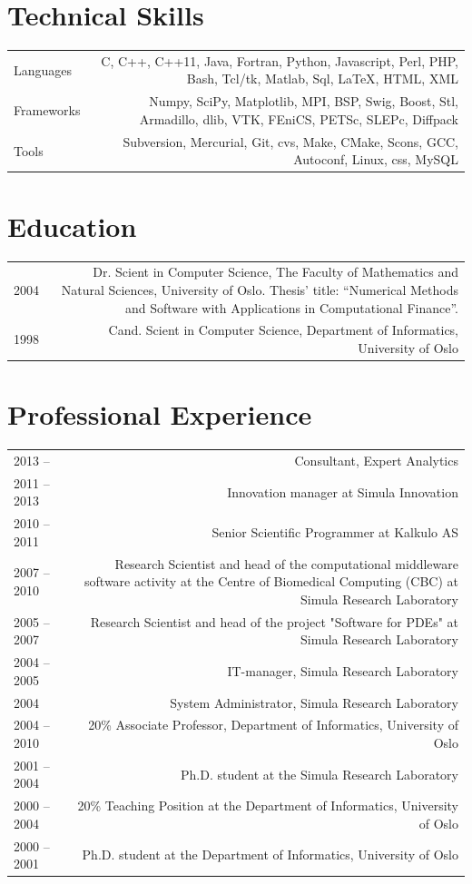 \documentclass[english,a4paper,11pt]{article}
\begin{document}
\section*{Technical Skills}
\begin{tabular}{LR}
Languages& C, C++, C++11, Java, Fortran, Python, Javascript, Perl, PHP, Bash, Tcl/tk, Matlab, Sql, LaTeX, HTML, XML\\
Frameworks& Numpy, SciPy, Matplotlib, MPI, BSP, Swig, Boost, Stl, Armadillo, dlib, VTK, FEniCS, PETSc, SLEPc, Diffpack\\
Tools& Subversion, Mercurial, Git, cvs, Make, CMake, Scons, GCC, Autoconf, Linux, css, MySQL
\end{tabular}

\section*{Education}
\begin{tabular}{LR}
2004 & Dr. Scient in Computer Science, The Faculty of Mathematics and Natural Sciences, University of Oslo. Thesis’ title: ``Numerical Methods and Software with Applications in Computational Finance''.\\
1998 & Cand. Scient in Computer Science, Department of Informatics, University of Oslo
\end{tabular}

\section*{Professional Experience}
\begin{tabular}{LR}
2013 -- & Consultant, Expert Analytics\\
2011 -- 2013& Innovation manager at Simula Innovation\\
2010 -- 2011& Senior Scientific Programmer at Kalkulo AS\\
2007 -- 2010& Research Scientist and head of the computational middleware software activity at the Centre of Biomedical Computing (CBC) at Simula Research Laboratory\\
2005 -- 2007& Research Scientist and head of the project "Software for PDEs" at Simula Research Laboratory\\
2004 -- 2005& IT-manager, Simula Research Laboratory\\
2004& System Administrator, Simula Research Laboratory\\
2004 -- 2010& 20\% Associate Professor, Department of Informatics, University of Oslo\\
2001 -- 2004& Ph.D. student at the Simula Research Laboratory\\
2000 -- 2004& 20\% Teaching Position at the Department of Informatics, University of Oslo\\
2000 -- 2001& Ph.D. student at the Department of Informatics, University of Oslo\\
\end{tabular}
\end{document}
